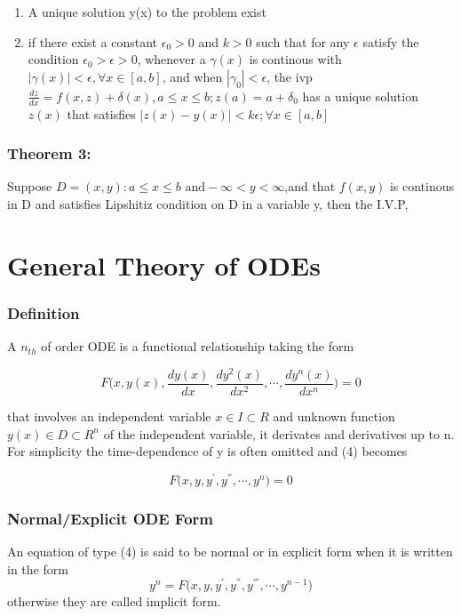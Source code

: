 \documentclass{article}
\begin{document}
\begin{enumerate}
    \item A unique solution y(x) to the problem exist
    \item if there exist a constant $\epsilon_{0} > 0$ and $k>0$ such that for any $\epsilon$ satisfy the condition $\epsilon_{0} > \epsilon > 0$, whenever a $\gamma(x)$ is continous with
    $| \gamma(x)| < \epsilon, \forall x \in [a,b] $, and when
    $| \gamma_{0}| < \epsilon$, the ivp $\frac{dz}{dx} = f(x,z)+ \delta(x), a \leq x \leq b; z(a) = a + \delta_{0}$ has a unique solution $z(x)$ that satisfies $|z(x)-y(x)| < k \epsilon; \forall x \in [a,b]$
\end{enumerate}


\subsubsection*{Theorem 3:} 
Suppose $D = {(x,y): a \le x \le b \text{ and} -\infty < y < \infty}$,and that $f(x,y)$ is continous in D and satisfies Lipshitiz condition on D in a variable y, then the I.V.P, 


\section{General Theory of ODEs}
\subsubsection*{Definition}
A $n_{th}$ of order ODE is a functional relationship taking the form

\begin{equation}
    F\biggl(x,y(x),\frac{dy(x)}{dx},\frac{dy^{2}(x)}{dx^{2}}, \dotsm, \frac{dy^{n}(x)}{dx^{n}}\biggr) = 0
\end{equation}

that involves an independent variable $x \in I \subset R$ and unknown function $y(x) \in D \subset R^{n}$ of the independent variable, it derivates and derivatives up to n. For simplicity the time-dependence of y is often omitted and (4) becomes

\begin{equation}
    F\biggl(x,y,y^{'},y^{''}, \dotsm ,y^{n}\biggr) = 0
\end{equation}

\subsubsection*{Normal/Explicit ODE Form}
An equation of type (4) is said to be normal or in explicit form when it is written in the form
\begin{equation}
    y^{n} = F\biggl(x,y,y^{'},y^{''},y^{'''}, \dotsm ,y^{n-1}\biggr)
\end{equation}
otherwise they are called implicit form.
\end{document}
